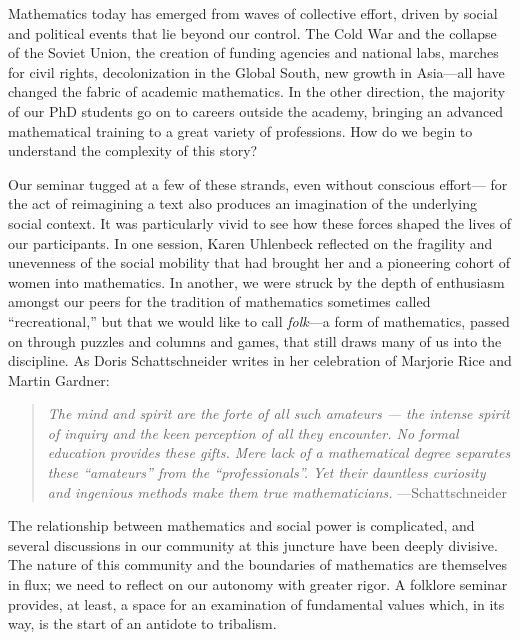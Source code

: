 \documentclass{article}
\begin{document}
%


%


 

%
 Mathematics today has emerged from waves of collective effort, driven by social and political events that lie beyond our control. The Cold War and the collapse of the Soviet Union, the creation of funding agencies and national labs, marches for civil rights, decolonization in the Global South, new growth in Asia---all have changed the fabric of  academic mathematics.  In the other direction, the majority of our PhD students go on to careers outside the academy, bringing an advanced mathematical training to a great variety of professions. How do we begin to understand the complexity of this story?
 
Our seminar tugged at a few of these strands, even without conscious effort— for the act of reimagining a text also produces an imagination of the underlying social context. It was particularly vivid to see how these forces shaped the lives of our participants. In one session, Karen Uhlenbeck reflected on the fragility and unevenness of the social mobility that had brought her and a pioneering cohort of women into mathematics. In another, we were struck by the depth of enthusiasm amongst our peers for the tradition of mathematics sometimes called “recreational,” but that we would like to call {\em folk}---a form of mathematics, passed on through puzzles and columns and games, that still draws many of us into the discipline. As Doris Schattschneider writes in her celebration of
Marjorie Rice and Martin Gardner:


\begin{quote}
{\em  The mind and spirit are the forte of all such amateurs --- the intense spirit of inquiry and the keen perception of all they encounter. No formal education provides these gifts. Mere lack of a mathematical degree separates these ``amateurs'' from the ``professionals''. Yet their dauntless curiosity and ingenious methods make them true mathematicians.} ---Schattschneider  \cite{Schattschneider}
\end{quote}

 The relationship between mathematics and social power is complicated, and several discussions in our community at this juncture have been deeply divisive. The nature of this community and the boundaries of mathematics are themselves in flux; we need to reflect on our autonomy with greater rigor. A folklore seminar provides, at least, a space for an examination of fundamental values which, in its way, is the start of an antidote to tribalism.
\end{document}
